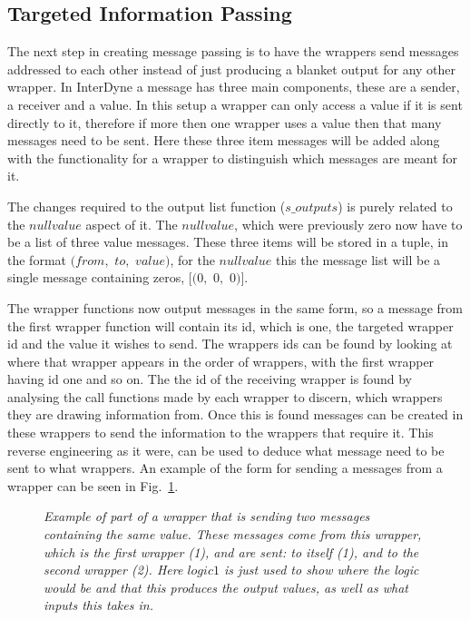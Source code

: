 \documentclass{article}
\begin{document}
\subsection{Targeted Information Passing}
The next step in creating message passing is to have the wrappers send messages addressed to each other instead of just producing a blanket output for any other wrapper. In InterDyne a message has three main components, these are a sender, a receiver and a value. In this setup a wrapper can only access a value if it is sent directly to it, therefore if more then one wrapper uses a value then that many messages need to be sent. Here these three item messages will be added along with the functionality for a wrapper to distinguish which messages are meant for it. 

The changes required to the output list function ($s\_outputs$) is purely related to the $nullvalue$ aspect of it. The $nullvalue$, which were previously zero now have to be a list of three value messages. These three items will be stored in a tuple, in the format $(from,$ $to,$ $value)$, for the $nullvalue$ this the message list will be a single message containing zeros, $[(0,$ $0,$ $0)]$.  

The wrapper functions now output messages in the same form, so a message from the first wrapper function will contain its id, which is one, the targeted wrapper id and the value it wishes to send. The wrappers id\textsc{}s can be found by looking at where that wrapper appears in the order of wrappers, with the first wrapper having id one and so on. The the id of the receiving wrapper is found by analysing the call functions made by each wrapper to discern, which wrappers they are drawing information from. Once this is found messages can be created in these wrappers to send the information to the wrappers that require it. This reverse engineering as it were, can be used to deduce what message need to be sent to what wrappers. An example of the form for sending a messages from a wrapper can be seen in Fig.~\ref{fig:outmes5}.  
\begin{figure}[H]
	\centering
	
	\caption{\it Example of part of a wrapper that is sending two messages containing the same value. These messages come from this wrapper, which is the first wrapper (1), and are sent: to itself (1), and to the second wrapper (2). Here $logic1$ is just used to show where the logic would be and that this produces the output values, as well as what inputs this takes in.}
	\label{fig:outmes5}
\end{figure} 
\end{document}
